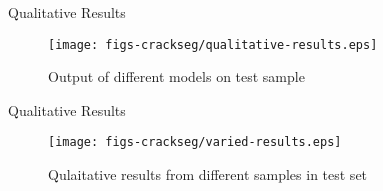\documentclass{lib/curtin_format}
\begin{document}
\begin{frame}{Qualitative Results}
   \begin{figure}
        \centering        
        \texttt{[image: figs-crackseg/qualitative-results.eps]}
        \caption{Output of different models on test sample}
        \label{fig:pipeline}
    \end{figure}
\end{frame}

\begin{frame}{Qualitative Results}
   \begin{figure}
        \centering        
        \texttt{[image: figs-crackseg/varied-results.eps]}
        \caption{Qulaitative results from different samples in test set}
        \label{fig:pipeline}
    \end{figure}
\end{frame}
\end{document}
